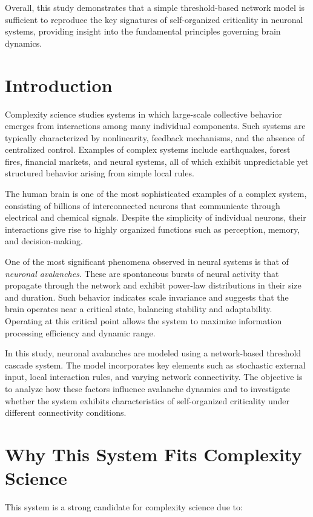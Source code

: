 \documentclass[12pt]{article}
\begin{document}
Overall, this study demonstrates that a simple threshold-based network model is sufficient to reproduce the key signatures of self-organized criticality in neuronal systems, providing insight into the fundamental principles governing brain dynamics.

\newpage
\section{Introduction}
Complexity science studies systems in which large-scale collective behavior emerges from interactions among many individual components. Such systems are typically characterized by nonlinearity, feedback mechanisms, and the absence of centralized control. Examples of complex systems include earthquakes, forest fires, financial markets, and neural systems, all of which exhibit unpredictable yet structured behavior arising from simple local rules.

The human brain is one of the most sophisticated examples of a complex system, consisting of billions of interconnected neurons that communicate through electrical and chemical signals. Despite the simplicity of individual neurons, their interactions give rise to highly organized functions such as perception, memory, and decision-making.

One of the most significant phenomena observed in neural systems is that of \textit{neuronal avalanches}. These are spontaneous bursts of neural activity that propagate through the network and exhibit power-law distributions in their size and duration. Such behavior indicates scale invariance and suggests that the brain operates near a critical state, balancing stability and adaptability. Operating at this critical point allows the system to maximize information processing efficiency and dynamic range.

In this study, neuronal avalanches are modeled using a network-based threshold cascade system. The model incorporates key elements such as stochastic external input, local interaction rules, and varying network connectivity. The objective is to analyze how these factors influence avalanche dynamics and to investigate whether the system exhibits characteristics of self-organized criticality under different connectivity conditions.

\section{Why This System Fits Complexity Science}
This system is a strong candidate for complexity science due to:
\end{document}
